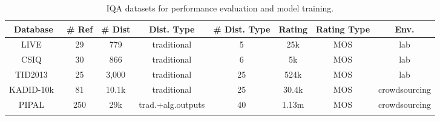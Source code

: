 \documentclass[10pt,twocolumn,letterpaper]{article}
\begin{document}
\begin{table*}[th]
\centering
\renewcommand{\arraystretch}{1.08}
\caption{IQA datasets for performance evaluation and model training.}
\begin{tabular}{cccccccc}
\toprule[1.2pt]
Database  & \# Ref & \# Dist & Dist. Type & \# Dist. Type & Rating & Rating Type & Env. \\ \hline
LIVE~\cite{sheikh2006statistical}      & 29    & 779    & traditional       & 5            & 25k    & MOS         & lab           \\
CSIQ~\cite{larson2010most}      & 30    & 866    & traditional       & 6            & 5k     & MOS         & lab           \\
TID2013~\cite{ponomarenko2015image}   & 25    & 3,000  & traditional       & 25           & 524k   & MOS         & lab           \\
KADID-10k~\cite{lin2019kadid} & 81    & 10.1k  & traditional       & 25           & 30.4k  & MOS         & crowdsourcing \\
PIPAL~\cite{jinjin2020pipal}     & 250   & 29k    & trad.+alg.outputs & 40           & 1.13m  & MOS         & crowdsourcing \\ \toprule[1.2pt]
\label{tab:data}
\end{tabular}
\end{table*}
\end{document}
